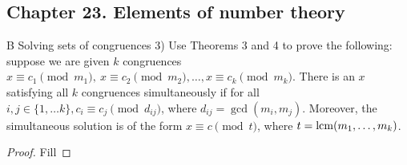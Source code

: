 \subsection*{Chapter 23. Elements of number theory}


\begin{exercise}{B Solving sets of congruences}
3) Use Theorems 3 and 4 to prove the following: suppose we are given $k$ congruences $x\equiv c_{1}\pmod{m_{1}},\ x\equiv c_{2}\pmod{m_{2}},\dots,x\equiv c_{k}\pmod{m_{k}}$. There is an $x$ satisfying all $k$ congruences simultaneously if for all $i,j\in \{1,\dots k\}, c_{i}\equiv c_{j}\pmod{d_{ij}}$, where $d_{ij}=\gcd(m_{i},m_{j})$. Moreover, the simultaneous solution is of the form $x\equiv c\pmod{t}$, where $t=\operatorname*{lcm}(m_{1},\dots,m_{k})$.
\end{exercise}
\begin{proof}
 Fill
\end{proof}


